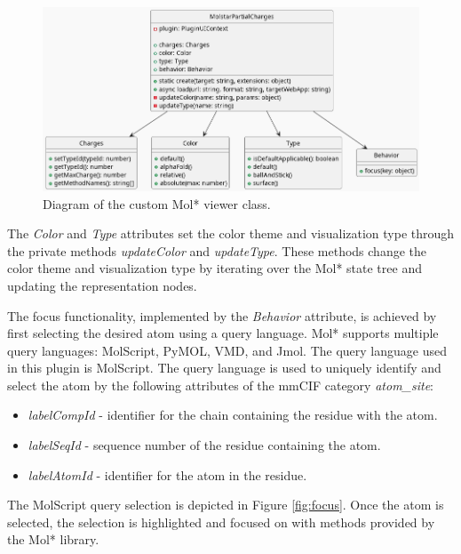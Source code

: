 \documentclass[
  digital,     %
  oneside,     %
  nosansbold,  %
  nocolorbold, %
  lof,         %
  lot,         %
]{fithesis4}
\begin{document}
\begin{figure}[htbp]
  \begin{center}
    \includegraphics[width=\textwidth]{out/figures/uml/viewer/viewer.png}
  \end{center}
  \caption{Diagram of the custom Mol* viewer class.}
  \label{fig:plugin_structure}
\end{figure}

The \textit{Color} and \textit{Type} attributes set the color theme and visualization type through the private methods \textit{updateColor} and \textit{updateType}. These methods change the color theme and visualization type by iterating over the Mol* state tree and updating the representation nodes.

The focus functionality, implemented by the \textit{Behavior} attribute, is achieved by first selecting the desired atom using a query language. Mol* supports multiple query languages: MolScript, PyMOL, VMD, and Jmol. The query language used in this plugin is MolScript. The query language is used to uniquely identify and select the atom by the following attributes of the mmCIF category \textit{atom\_site}:

\begin{itemize}
  \item \textit{labelCompId} - identifier for the chain containing the residue with the atom.
  \item \textit{labelSeqId} - sequence number of the residue containing the atom.
  \item \textit{labelAtomId} - identifier for the atom in the residue.
\end{itemize}

The MolScript query selection is depicted in Figure \ref{fig:focus}. Once the atom is selected, the selection is highlighted and focused on with methods provided by the Mol* library.
\end{document}

